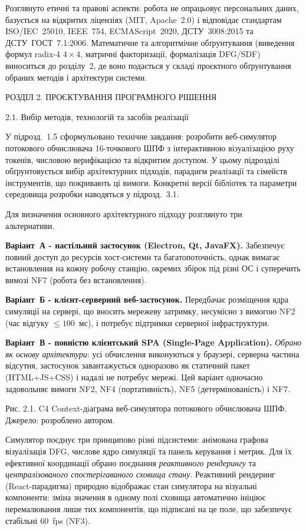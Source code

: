 \documentclass[
]{article}
\begin{document}
Розглянуто етичні та правові аспекти: робота не опрацьовує персональних
даних, базується на відкритих ліцензіях (MIT, Apache~2.0) і відповідає
стандартам ISO/IEC~25010, IEEE~754, ECMAScript~2020, ДСТУ~3008:2015 та
ДСТУ~ГОСТ~7.1:2006. Математичне та алгоритмічне обґрунтування (виведення
формул radix-4 \(4 \times 4\), матричні факторизації, формалізація
DFG/SDF) виноситься до розділу~2, де воно подається у складі проєктного
обґрунтування обраних методів і архітектури системи.

\protect{}\label{_Toc228121443}{}РОЗДІЛ 2. ПРОЄКТУВАННЯ
ПРОГРАМНОГО РІШЕННЯ

\protect{}\label{_Toc228121444}{}2.1. Вибір методів,
технологій та засобів реалізації

У підрозд.~1.5 сформульовано технічне завдання: розробити веб-симулятор
потокового обчислювача 16-точкового ШПФ з інтерактивною візуалізацією
руху токенів, числовою верифікацією та відкритим доступом. У цьому
підрозділі обґрунтовується вибір архітектурних підходів, парадигм
реалізації та сімейств інструментів, що покривають ці вимоги. Конкретні
версії бібліотек та параметри середовища розробки наводяться у
підрозд.~3.1.

Для визначення основного архітектурного підходу розглянуто три\\
альтернативи.

\textbf{Варіант~А - настільний застосунок (Electron, Qt, JavaFX).}
Забезпечує повний доступ до ресурсів хост-системи та багатопоточність,
однак вимагає встановлення на кожну робочу станцію, окремих збірок під
різні ОС і суперечить вимозі NF7 (робота без встановлення).

\textbf{Варіант~Б - клієнт-серверний веб-застосунок.} Передбачає
розміщення ядра симуляції на сервері, що вносить мережеву затримку,
несумісно з вимогою NF2 (час відгуку \(\leq 100\)~мс), і потребує
підтримки серверної інфраструктури.

\textbf{Варіант~В - повністю клієнтський SPA (Single-Page Application).}
\emph{Обрано як основу архітектури}: усі обчислення виконуються у
браузері, серверна частина відсутня, застосунок завантажується
одноразово як статичний пакет (HTML+JS+CSS) і надалі не потребує мережі.
Цей варіант одночасно задовольняє вимоги NF2, NF4 (портативність), NF5
(детермінованість) і NF7.

Рис. 2.1. C4 Context-дiаграма веб-симулятора потокового обчислювача ШПФ.
Джерело: розроблено автором.

Симулятор поєднує три принципово різні підсистеми: анімована графова
візуалізація DFG, числове ядро симуляції та панель керування і метрик.
Для їх ефективної координації обрано поєднання \emph{реактивного
рендерингу} та \emph{централізованого спостерігаваного сховища стану}.
Реактивний рендеринг (React-парадигма) природно відображає стан
симулятора на візуальні компоненти: зміна значення в одному полі сховища
автоматично ініціює перемалювання лише тих компонентів, що підписані на
це поле, що забезпечує стабільні 60~fps (NF3).
\end{document}
